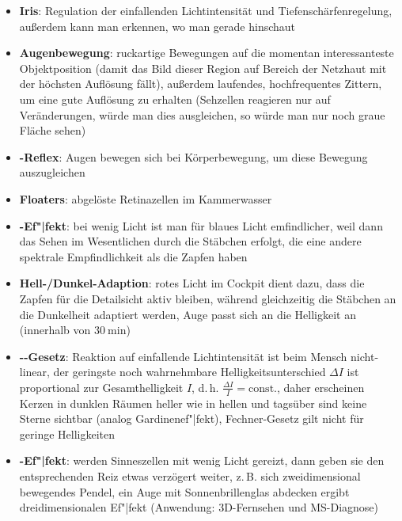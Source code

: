 \begin{itemize}
    \item
    \textbf{Iris}:
    Regulation der einfallenden Lichtintensität und Tiefenschärfenregelung,
    außerdem kann man erkennen, wo man gerade hinschaut

    \item
    \textbf{Augenbewegung}:
    ruckartige Bewegungen auf die momentan interessanteste Objektposition
    (damit das Bild dieser Region auf Bereich der Netzhaut mit der höchsten
    Auflösung fällt),
    außerdem laufendes, hochfrequentes Zittern, um eine gute Auflösung zu
    erhalten (Sehzellen reagieren nur auf Veränderungen, würde man dies
    ausgleichen, so würde man nur noch graue Fläche sehen)

    \item
    \textbf{-Reflex}:
    Augen bewegen sich bei Körperbewegung, um diese Bewegung auszugleichen

    \item
    \textbf{Floaters}:
    abgelöste Retinazellen im Kammerwasser
\end{itemize}
\linie
\pagebreak
\begin{itemize}
    \item
    \textbf{-Ef"|fekt}:
    bei wenig Licht ist man für blaues Licht emfindlicher, weil dann das Sehen
    im Wesentlichen durch die Stäbchen erfolgt, die eine andere spektrale
    Empfindlichkeit als die Zapfen haben

    \item
    \textbf{Hell-/Dunkel-Adaption}:
    rotes Licht im Cockpit dient dazu, dass die Zapfen für die Detailsicht
    aktiv bleiben, während gleichzeitig die Stäbchen an die Dunkelheit
    adaptiert werden,
    Auge passt sich an die Helligkeit an (innerhalb von $\SI{30}{\minute}$)

    \item
    \textbf{--Gesetz}:
    Reaktion auf einfallende Lichtintensität ist beim Mensch nicht-linear,
    der geringste noch wahrnehmbare Helligkeitsunterschied $\Delta I$
    ist proportional zur Gesamthelligkeit $I$,
    d.\,h. $\frac{\Delta I}{I} = \text{const.}$,
    daher erscheinen Kerzen in dunklen Räumen heller wie in hellen
    und tagsüber sind keine Sterne sichtbar (analog Gardinenef"|fekt),
    Fechner-Gesetz gilt nicht für geringe Helligkeiten

    \item
    \textbf{-Ef"|fekt}:
    werden Sinneszellen mit wenig Licht gereizt, dann geben sie den
    entsprechenden Reiz etwas verzögert weiter,
    z.\,B. sich zweidimensional bewegendes Pendel, ein Auge mit
    Sonnenbrillenglas abdecken ergibt dreidimensionalen Ef"|fekt
    (Anwendung: 3D-Fernsehen und MS-Diagnose)
\end{itemize}

